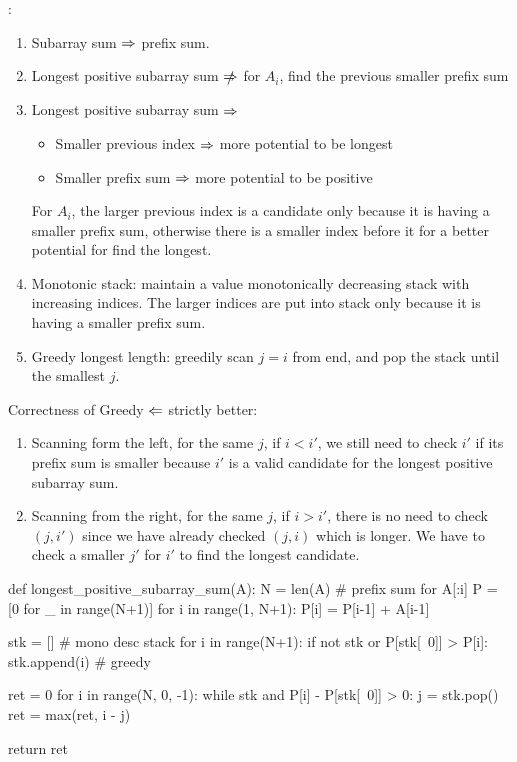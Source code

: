 :
\begin{enumerate}
\item Subarray sum $\Rightarrow$ prefix sum.
\item Longest positive subarray sum $\slashed{\Rightarrow}$ for $A_i$, find the previous smaller prefix sum 
\item Longest positive subarray sum $\Rightarrow$ 
  \begin{itemize}
  \item Smaller previous index $\Rightarrow$ more potential to be longest 
  \item Smaller prefix sum $\Rightarrow$ more potential to be positive
  \end{itemize}
For $A_i$, the larger previous index is a candidate only because it is having a smaller prefix sum, otherwise there is a smaller index before it for a better potential for find the longest. 

\item Monotonic stack: maintain a value monotonically decreasing stack with increasing indices. The larger indices are put into stack only because it is having a smaller prefix sum. 
\item Greedy longest length: greedily scan $j=i$ from end, and pop the stack until the smallest $j$. 
\end{enumerate}

Correctness of Greedy $\Leftarrow$ strictly better: 
\begin{enumerate}
\item Scanning form the left, for the same $j$, if $i < i'$, we still need to check $i'$ if its prefix sum is smaller because $i'$ is a valid candidate for the longest positive subarray sum. 
\item Scanning from the right, for the same $j$, if $i > i'$, there is no need to check $(j, i')$ since we have already checked $(j, i)$ which is longer. We have to check a smaller $j'$ for $i'$ to find the longest candidate. 
\end{enumerate}
\begin{python}
def longest_positive_subarray_sum(A):
    N = len(A)
    # prefix sum for A[:i]
    P = [0 for _ in range(N+1)]
    for i in range(1, N+1):
        P[i] = P[i-1] + A[i-1]

    stk = []  # mono desc stack
    for i in range(N+1):
        if not stk or P[stk[~0]] > P[i]:
            stk.append(i)  # greedy
    
    ret = 0
    for i in range(N, 0, -1):
        while stk and P[i] - P[stk[~0]] > 0:
            j = stk.pop()
            ret = max(ret, i - j)
    
    return ret
\end{python}

